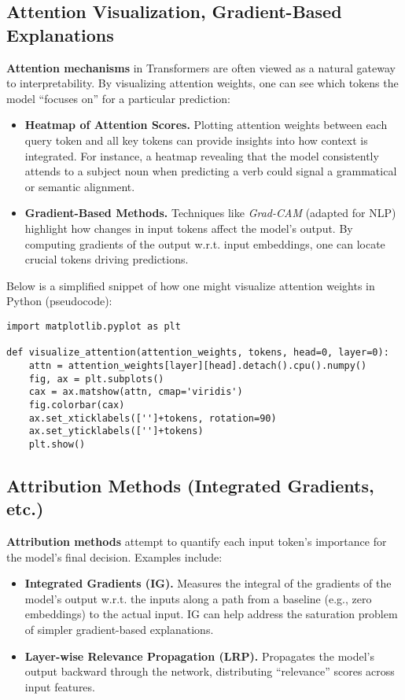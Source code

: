 \subsection{Attention Visualization, Gradient-Based Explanations}
\noindent
\textbf{Attention mechanisms} in Transformers are often viewed as a natural gateway to interpretability. By visualizing attention weights, one can see which tokens the model “focuses on” for a particular prediction:
\begin{itemize}
    \item \textbf{Heatmap of Attention Scores.} Plotting attention weights between each query token and all key tokens can provide insights into how context is integrated. For instance, a heatmap revealing that the model consistently attends to a subject noun when predicting a verb could signal a grammatical or semantic alignment.
    \item \textbf{Gradient-Based Methods.} Techniques like \emph{Grad-CAM} (adapted for NLP) highlight how changes in input tokens affect the model’s output. By computing gradients of the output w.r.t. input embeddings, one can locate crucial tokens driving predictions.
\end{itemize}

\noindent
Below is a simplified snippet of how one might visualize attention weights in Python (pseudocode):

\begin{verbatim}
import matplotlib.pyplot as plt

def visualize_attention(attention_weights, tokens, head=0, layer=0):
    attn = attention_weights[layer][head].detach().cpu().numpy()
    fig, ax = plt.subplots()
    cax = ax.matshow(attn, cmap='viridis')
    fig.colorbar(cax)
    ax.set_xticklabels(['']+tokens, rotation=90)
    ax.set_yticklabels(['']+tokens)
    plt.show()
\end{verbatim}

\subsection{Attribution Methods (Integrated Gradients, etc.)}
\noindent
\textbf{Attribution methods} attempt to quantify each input token’s importance for the model’s final decision. Examples include:
\begin{itemize}
    \item \textbf{Integrated Gradients (IG).} Measures the integral of the gradients of the model’s output w.r.t. the inputs along a path from a baseline (e.g., zero embeddings) to the actual input. IG can help address the saturation problem of simpler gradient-based explanations.
    \item \textbf{Layer-wise Relevance Propagation (LRP).} Propagates the model’s output backward through the network, distributing “relevance” scores across input features.
\end{itemize}

